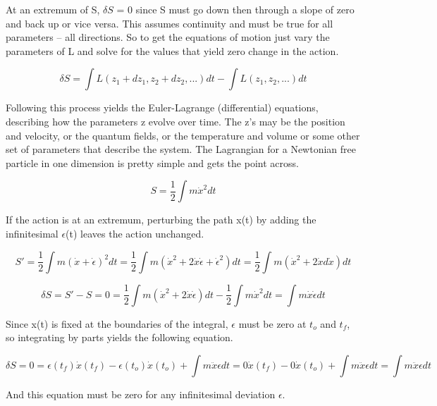 At an extremum of S, $\delta S$ = 0 since S must go down then through a slope of zero and back up or vice versa. This assumes continuity and must be true for all parameters -- all directions. So to get the equations of motion just vary the parameters of L and solve for the values that yield zero change in the action.

\begin{equation}
\delta S = \int L(z_1 + dz_1, z_2+dz_2, ...)dt - \int L(z_1, z_2, ...)dt 
\end{equation}

Following this process yields the Euler-Lagrange (differential) equations, describing how the parameters z evolve over time. The z's may be the position and velocity, or the quantum fields, or the temperature and volume or some other set of parameters that describe the system. The Lagrangian for a Newtonian free particle in one dimension is pretty simple and gets the point across. 

\begin{equation}
S = \frac{1}{2} \int m\dot{x}^2 dt
\end{equation}

If the action is at an extremum, perturbing the path x(t) by adding the infinitesimal $\epsilon$(t) leaves the action unchanged.

\begin{equation}
S' = \frac{1}{2} \int m(\dot{x} + \dot{\epsilon})^2 dt = \frac{1}{2} \int m(\dot{x}^2 + 2\dot{x}\dot{\epsilon} + \dot{\epsilon}^2) dt =  
\frac{1}{2} \int m(\dot{x}^2 + 2\dot{x}d\dot{x}) dt 
\end{equation}

\begin{equation}
\delta S = S' - S = 0 = \frac{1}{2} \int m(\dot{x}^2 + 2\dot{x}\dot{\epsilon}) dt - \frac{1}{2} \int m\dot{x}^2 dt = \int m\dot{x}\dot{\epsilon} dt
\end{equation}

Since x(t) is fixed at the boundaries of the integral, $\epsilon$ must be zero at $t_o$ and $t_f$, so integrating by parts yields the following equation. 

\begin{equation}
\delta S = 0 = \epsilon(t_f) \dot{x}(t_f)  - \epsilon(t_o) \dot{x}(t_o) + \int m\ddot{x} \epsilon dt  = 
0\dot{x}(t_f)  - 0\dot{x}(t_o) + \int m\ddot{x} \epsilon dt = \int m\ddot{x} \epsilon dt
\end{equation}

And this equation must be zero for any infinitesimal deviation $\epsilon$.


